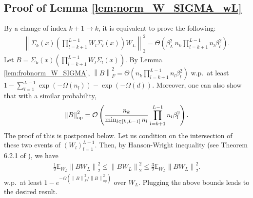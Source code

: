 \documentclass[11pt]{article}
\newcommand{\E}{\mathbb{E}}
\newenvironment{proof}{\par\noindent{\bf Proof:\ }}{\hfill$\Box$\\[2mm]}
\newcommand{\bigO}[1]{\mathcal{O}\left(#1\right)}
\newcommand{\bigOmg}[1]{\Omega\left(#1\right)}
\newcommand{\bigTheta}[1]{\Theta\left(#1\right)}
\newcommand{\bigexp}[1]{\exp\left(#1\right)}
\newcommand{\norm}[1]{\left\|#1\right\|}
\def\HWineq{Theorem 6.2.1 of \cite{vershynin2018high}}
\def\op{\mathrm{op}}
\def\min{\mathop{\rm min}\nolimits}
\begin{document}
\subsection{Proof of Lemma \ref{lem:norm_W_SIGMA_wL}}\label{app:norm_W_SIGMA_wL}
    By a change of index $k+1\to k$, it is equivalent to prove the following:
    \begin{align*}
	\norm{\Sigma_{k}(x) \left(\prod_{l=k+1}^{L-1} W_l\Sigma_l(x)\right) W_L }_2^2
	= \bigTheta{\beta_L^2\, n_{k} \prod_{l=k+1}^{L-1} n_l\beta_l^2}.
    \end{align*}
    Let $B=\Sigma_{k}(x) \left(\prod_{l=k+1}^{L-1} W_l\Sigma_l(x)\right).$
    By Lemma \ref{lem:frobnorm_W_SIGMA}, $\norm{B}_F^2  = \bigTheta{n_k \prod_{l=k+1}^{L-1} n_l\beta_l^2}$
    w.p.\ at least $1-\sum_{l=1}^{L-1}\bigexp{-\bigOmg{n_l}}-\bigexp{-\bigOmg{d}}.$
    Moreover, one can also show that with a similar probability,
    \begin{align*}
	\norm{B}_{\op}^2=\bigO{\frac{n_k}{\min_{l\in[k,L-1]}n_l} \prod_{l=k+1}^{L-1} n_l\beta_l^2} .
    \end{align*}
    The proof of this is postponed below.
    Let us condition on the intersection of these two events of $(W_l)_{l=1}^{L-1}.$
    Then, by Hanson-Wright inequality (see \HWineq), we have
    \begin{align*}
	\frac{1}{2}\E_{W_L}\norm{BW_L}_2^2\leq \norm{BW_L}_2^2 \leq \frac{3}{2}\E_{W_L}\norm{BW_L}_2^2 .
    \end{align*}
    w.p.\ at least $1-e^{-\bigOmg{ \norm{B}_F^2/\norm{B}_{\op}^2 } }$ over $W_L.$ 
    Plugging the above bounds leads to the desired result. 
    
\end{document}
